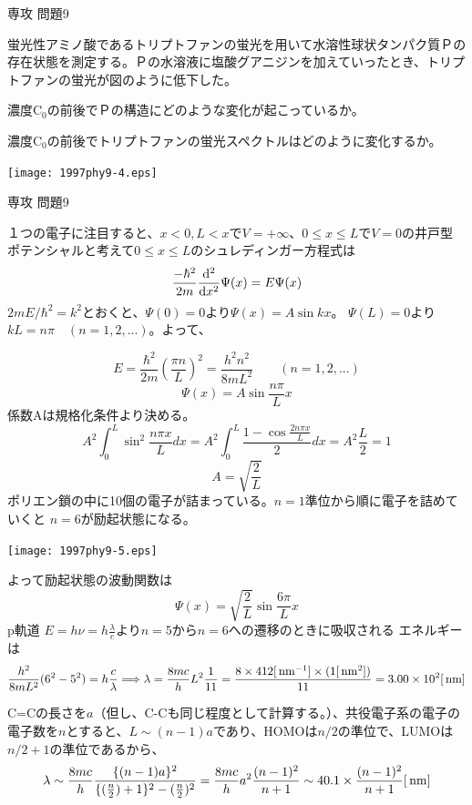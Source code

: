 \documentclass[fleqn]{jbook}
\begin{document}
\begin{question}{専攻 問題9}{}
\begin{subquestions}
\parbox[t]{100mm}{
\SubQuestion
蛍光性アミノ酸であるトリプトファンの蛍光を用いて水溶性球状タンパク質Ｐの存在状態を測定する。Ｐの水溶液に塩酸グアニジンを加えていったとき、トリプトファンの蛍光が図のように低下した。

\begin{subsubquestions}
\SubSubQuestion
濃度C$_0$の前後でＰの構造にどのような変化が起こっているか。

\SubSubQuestion
濃度C$_0$の前後でトリプトファンの蛍光スペクトルはどのように変化するか。
\end{subsubquestions}
}\parbox[t]{60mm}{
\begin{center}
\texttt{[image: 1997phy9-4.eps]}
\end{center}
}
\end{subquestions}
\end{question}
\begin{answer}{専攻 問題9}{}

\begin{subanswers}
\SubAnswer

\begin{subsubanswers}
\SubSubAnswer
１つの電子に注目すると、$x<0,L<x$で$V=+\infty$、$0\le x\le L$で$V=0$の井戸型
ポテンシャルと考えて$0\le x\le L$のシュレディンガー方程式は
\[
\frac{-\hbar^2}{2m}{\frac{{\rm d} ^2}{{\rm d} x^2}}\Psi(x)=E\Psi(x)
\]
$2mE/\hbar^2=k^2$とおくと、$\Psi(0)=0$より$\Psi(x)=A\sin kx$。
$\Psi(L)=0$より$kL=n\pi \quad (n=1,2,...)$。よって、
\parbox[t]{100mm}{
\[
E=\frac{\hbar^2}{2m}\left(\frac{\pi n}{L}\right)^2=\frac{h^2n^2}{8mL^2}\qquad (n=1,2,...)
\]
\[
\Psi(x)=A\sin \frac{n\pi}{L}x
\]
係数Aは規格化条件より決める。
\[
A^2\int_0^L\sin^2 \frac{n\pi x}{L}dx=A^2\int_0^L\frac{1-\cos \frac{2n\pi x}{L}}
{2}dx=A^2\frac{L}{2}=1
\]
\[
A=\sqrt{\frac{2}{L}}
\]
ポリエン鎖の中に10個の電子が詰まっている。$n=1$準位から順に電子を詰めていくと
$n=6$が励起状態になる。}\parbox[t]{60mm}
{
\begin{center}
\texttt{[image: 1997phy9-5.eps]}
\end{center}
}

よって励起状態の波動関数は
\[
\Psi(x)=\sqrt{\frac{2}{L}}\sin \frac{6\pi }{L}x
\]
%
\SubSubAnswer
p軌道
%
\SubSubAnswer
$E=h\nu=h\frac{\lambda}{c}$より$n=5$から$n=6$への遷移のときに吸収される
エネルギーは
\[
\frac{h^2}{8mL^2}(6^2-5^2)=h\frac{c}{\lambda}
\Longrightarrow
\lambda=\frac{8mc}{h}L^2\frac{1}{11}=\frac{8\times 412[{\,{\rm nm}}^{-1}]
\times (1[{\,{\rm nm}}^2])}{11}=3.00\times 10^2[{\,{\rm nm}}]
\]


\SubSubAnswer
C=Cの長さを$a$（但し、C-Cも同じ程度として計算する。）、共役電子系の電子の電子数を$n$とすると、$L \sim (n-1)a$であり、HOMOは$n/2$の準位で、LUMOは$n/2+1$の準位であるから、
\[
\lambda \sim \frac{8mc}{h}\frac{\{(n-1)a\}^2}{\{(\frac{n}{2})+1\}^2-(\frac{n}{2})^2} = \frac{8mc}{h}a^2 \frac{(n-1)^2}{n+1} \sim 40.1 \times \frac{(n-1)^2}{n+1} [\,{\rm nm}]
\]
 

\end{subsubanswers}
\end{subanswers}
\end{answer}
\end{document}
